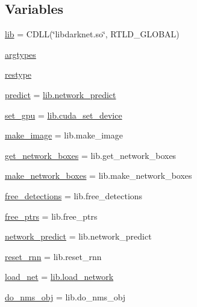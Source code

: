\subsection*{Variables}
\begin{DoxyCompactItemize}
\item 
\mbox{\hyperlink{namespacedarknet_ab817163f62e1395d5b07a0efe5a9a5ba}{lib}} = C\+D\+LL(\char`\"{}libdarknet.\+so\char`\"{}, R\+T\+L\+D\+\_\+\+G\+L\+O\+B\+AL)
\item 
\mbox{\hyperlink{namespacedarknet_a4e9a5fc4a3c6b775fdfa9eaee9aaf382}{argtypes}}
\item 
\mbox{\hyperlink{namespacedarknet_a236a643b258c1e18e3051a0460b4717d}{restype}}
\item 
\mbox{\hyperlink{namespacedarknet_af6de8015ea12cdd6c4fc75cde1e785df}{predict}} = \mbox{\hyperlink{network_8c_a90179d7287c26a987c4722b81ec9a579}{lib.\+network\+\_\+predict}}
\item 
\mbox{\hyperlink{namespacedarknet_ac5e2e5729199c2e38ae506e60888324c}{set\+\_\+gpu}} = \mbox{\hyperlink{cuda_8c_aa4214bec4ec8eda4c37f5e1487efa2e9}{lib.\+cuda\+\_\+set\+\_\+device}}
\item 
\mbox{\hyperlink{namespacedarknet_afcaae0b369287ee4f8ee7ef51ddd22b1}{make\+\_\+image}} = lib.\+make\+\_\+image
\item 
\mbox{\hyperlink{namespacedarknet_ab7f7896dc9f1e9ed6dcb44af8e2ce453}{get\+\_\+network\+\_\+boxes}} = lib.\+get\+\_\+network\+\_\+boxes
\item 
\mbox{\hyperlink{namespacedarknet_a8c38abc84ebb7e2c24b1ceb5b6af21ec}{make\+\_\+network\+\_\+boxes}} = lib.\+make\+\_\+network\+\_\+boxes
\item 
\mbox{\hyperlink{namespacedarknet_a930fc8c0ad24a45678775b4bcb2d744e}{free\+\_\+detections}} = lib.\+free\+\_\+detections
\item 
\mbox{\hyperlink{namespacedarknet_a0b1357754b88c0ec40003d81b94b642a}{free\+\_\+ptrs}} = lib.\+free\+\_\+ptrs
\item 
\mbox{\hyperlink{namespacedarknet_a3b055662e0f991bb29e2dedac571fd3b}{network\+\_\+predict}} = lib.\+network\+\_\+predict
\item 
\mbox{\hyperlink{namespacedarknet_a3b81bfa75dea1539c68ceea4e8e1d1ab}{reset\+\_\+rnn}} = lib.\+reset\+\_\+rnn
\item 
\mbox{\hyperlink{namespacedarknet_aec4fa651fbaf4fa7a43642897d7763c0}{load\+\_\+net}} = \mbox{\hyperlink{network_8c_a0ea267bea4a8bc7e7a05cb44e41a4e59}{lib.\+load\+\_\+network}}
\item 
\mbox{\hyperlink{namespacedarknet_acb4a34668c7ee14161302ee07f3a322a}{do\+\_\+nms\+\_\+obj}} = lib.\+do\+\_\+nms\+\_\+obj

\end{DoxyCompactItemize}
